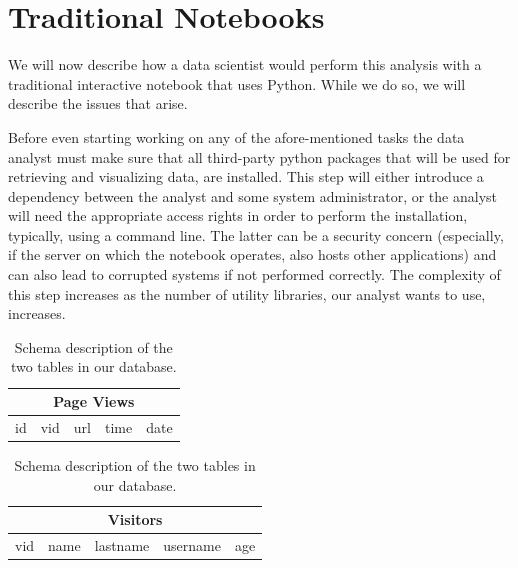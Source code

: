 \section{Traditional Notebooks}



We will now describe how a data scientist would perform this analysis with a traditional interactive notebook that uses Python. While we do so, we will describe the issues that arise.

 Before even starting working on any of the afore-mentioned tasks the data analyst must make sure that all third-party python packages that will be used for retrieving and visualizing data, are installed. This step will either introduce a dependency between the analyst and some system administrator, or the analyst will need the appropriate access rights in order to perform the installation, typically, using a command line. The latter can be a security concern (especially, if the server on which the notebook operates, also hosts other applications) and can also lead to corrupted systems if not performed correctly. The complexity of this step increases as the number of utility libraries, our analyst wants to use, increases. 

\begin{table}
\begin{center}

\begin{tabular}{|c|c|c|c|c|}
\hline 
\multicolumn{5}{|c|}{Page Views} \\ 
\hline 
id & vid & url & time & date \\ 
\hline 
\end{tabular} 

\hfill

\begin{tabular}{|c|c|c|c|c|}
\hline 
\multicolumn{5}{|c|}{Visitors} \\ 
\hline 
vid & name & lastname & username & age \\ 
\hline 
\end{tabular} 

\end{center}
\caption{Schema description of the two tables in our database.}
\label{tab:schema}
\end{table}



